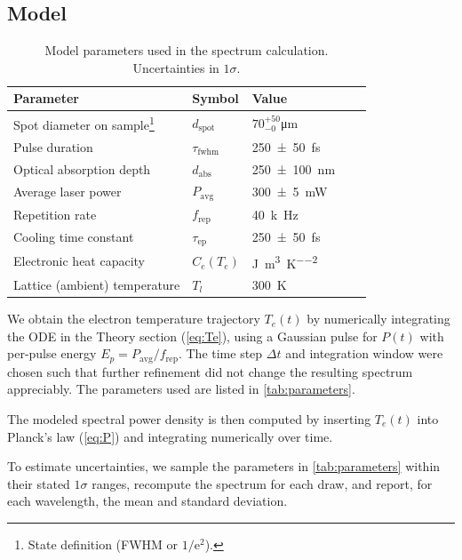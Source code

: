 \documentclass[
	parskip=half,
	a4paper,
]{scrarticle}
\begin{document}
\subsection{Model}
\begin{table}
    \centering
    \begin{tabular}{lllll}
        Parameter & Symbol & Value & \\
        \hline
        Spot diameter on sample\footnote{State definition (FWHM or $1/\mathrm e^2$).} & $d_{\text{spot}}$ & $70^{+50}_{-0}$\;\si{\micro\metre}\\
        Pulse duration & $\tau_\text{fwhm}$ & \SI{250(50)}{fs} & \\
        Optical absorption depth & $d_{\text{abs}}$ & \SI{250(100)}{\nano\metre} &  &  \\
        Average laser power & $P_{\text{avg}}$ & \SI{300(5)}{mW} &  &  \\
        Repetition rate & $f_{\text{rep}}$ & \SI{40}{k\hertz} &  &  \\
        Cooling time constant & $\tau_{\mathrm{ep}}$ & \SI{250(50)}{fs} & \cite{stange_hot_2015} &  \\
        Electronic heat capacity & $C_e(T_e)$ & \si{\joule\per\metre\cubed\per\kelvin\squared} & \cite{nihira_temperature_2003} &  \\
        Lattice (ambient) temperature & $T_l$ & \SI{300}{\kelvin} & &  \\
    \end{tabular}
    \caption{Model parameters used in the spectrum calculation. Uncertainties in $1\sigma$.}
    \label{tab:parameters}
\end{table}

We obtain the electron temperature trajectory $T_e(t)$ by numerically integrating the ODE in the Theory section (\autoref{eq:Te}), using a Gaussian pulse for $P(t)$ with per-pulse energy $E_p = P_{\text{avg}}/f_{\text{rep}}$. The time step $\Delta t$ and integration window were chosen such that further refinement did not change the resulting spectrum appreciably. The parameters used are listed in \autoref{tab:parameters}.

The modeled spectral power density is then computed by inserting $T_e(t)$ into Planck’s law (\autoref{eq:P}) and integrating numerically over time.

To estimate uncertainties, we sample the parameters in \autoref{tab:parameters} within their stated $1\sigma$ ranges, recompute the spectrum for each draw, and report, for each wavelength, the mean and standard deviation.
\end{document}
